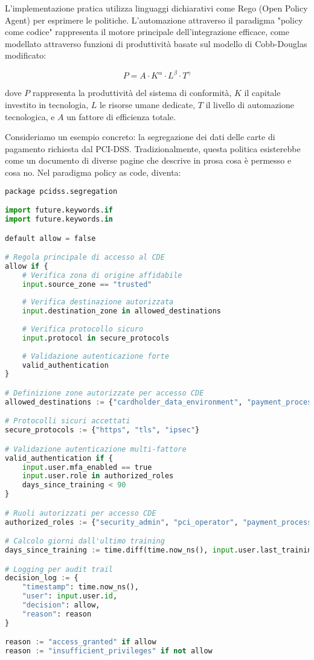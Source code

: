 L'implementazione pratica utilizza linguaggi dichiarativi come Rego (Open Policy Agent) per esprimere le politiche. L'automazione attraverso il paradigma "policy come codice" rappresenta il motore principale dell'integrazione efficace, come modellato attraverso funzioni di produttività basate sul modello di Cobb-Douglas modificato\autocite{Brynjolfsson2016}:

\begin{equation}
P = A \cdot K^{\alpha} \cdot L^{\beta} \cdot T^{\gamma}
\end{equation}

dove $P$ rappresenta la produttività del sistema di conformità, $K$ il capitale investito in tecnologia, $L$ le risorse umane dedicate, $T$ il livello di automazione tecnologica, e $A$ un fattore di efficienza totale.

Consideriamo un esempio concreto: la segregazione dei dati delle carte di pagamento richiesta dal PCI-DSS. Tradizionalmente, questa politica esisterebbe come un documento di diverse pagine che descrive in prosa cosa è permesso e cosa no. Nel paradigma policy as code, diventa:

\begin{lstlisting}[language=Python, caption=Implementazione Policy as Code per segregazione PCI-DSS]
package pcidss.segregation

import future.keywords.if
import future.keywords.in

default allow = false

# Regola principale di accesso al CDE
allow if {
    # Verifica zona di origine affidabile
    input.source_zone == "trusted"
    
    # Verifica destinazione autorizzata
    input.destination_zone in allowed_destinations
    
    # Verifica protocollo sicuro
    input.protocol in secure_protocols
    
    # Validazione autenticazione forte
    valid_authentication
}

# Definizione zone autorizzate per accesso CDE
allowed_destinations := {"cardholder_data_environment", "payment_processing"}

# Protocolli sicuri accettati
secure_protocols := {"https", "tls", "ipsec"}

# Validazione autenticazione multi-fattore
valid_authentication if {
    input.user.mfa_enabled == true
    input.user.role in authorized_roles
    days_since_training < 90
}

# Ruoli autorizzati per accesso CDE
authorized_roles := {"security_admin", "pci_operator", "payment_processor"}

# Calcolo giorni dall'ultimo training
days_since_training := time.diff(time.now_ns(), input.user.last_training_ns) / (24 * 60 * 60 * 1000000000)

# Logging per audit trail
decision_log := {
    "timestamp": time.now_ns(),
    "user": input.user.id,
    "decision": allow,
    "reason": reason
}

reason := "access_granted" if allow
reason := "insufficient_privileges" if not allow
\end{lstlisting}

